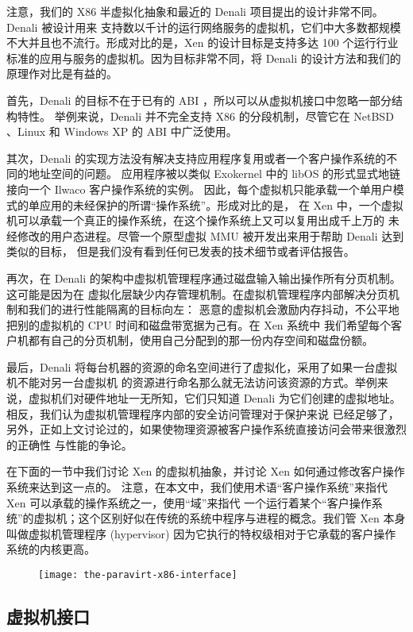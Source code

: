 注意，我们的 X86 半虚拟化抽象和最近的 Denali 项目提出的设计非常不同。Denali 被设计用来
支持数以千计的运行网络服务的虚拟机，它们中大多数都规模不大并且也不流行。形成对比的是，Xen
的设计目标是支持多达 100 个运行行业标准的应用与服务的虚拟机。因为目标非常不同，将 Denali
的设计方法和我们的原理作对比是有益的。

首先，Denali 的目标不在于已有的 ABI ，所以可以从虚拟机接口中忽略一部分结构特性。
举例来说，Denali 并不完全支持 X86 的分段机制，尽管它在 NetBSD 、Linux 和 Windows XP
的 ABI 中广泛使用。

其次，Denali 的实现方法没有解决支持应用程序复用或者一个客户操作系统的不同的地址空间的问题。
应用程序被以类似 Exokernel 中的 libOS 的形式显式地链接向一个 Ilwaco 客户操作系统的实例。
因此，每个虚拟机只能承载一个单用户模式的单应用的未经保护的所谓“操作系统”。形成对比的是，
在 Xen 中，一个虚拟机可以承载一个真正的操作系统，在这个操作系统上又可以复用出成千上万的
未经修改的用户态进程。尽管一个原型虚拟 MMU 被开发出来用于帮助 Denali 达到类似的目标，
但是我们没有看到任何已发表的技术细节或者评估报告。

再次，在 Denali 的架构中虚拟机管理程序通过磁盘输入输出操作所有分页机制。这可能是因为在
虚拟化层缺少内存管理机制。在虚拟机管理程序内部解决分页机制和我们的进行性能隔离的目标向左：
恶意的虚拟机会激励内存抖动，不公平地把别的虚拟机的 CPU 时间和磁盘带宽据为己有。在 Xen 系统中
我们希望每个客户机都有自己的分页机制，使用自己分配到的那一份内存空间和磁盘份额。

最后，Denali 将每台机器的资源的命名空间进行了虚拟化，采用了如果一台虚拟机不能对另一台虚拟机
的资源进行命名那么就无法访问该资源的方式。举例来说，虚拟机们对硬件地址一无所知，它们只知道
Denali 为它们创建的虚拟地址。相反，我们认为虚拟机管理程序内部的安全访问管理对于保护来说
已经足够了，另外，正如上文讨论过的，如果使物理资源被客户操作系统直接访问会带来很激烈的正确性
与性能的争论。

在下面的一节中我们讨论 Xen 的虚拟机抽象，并讨论 Xen 如何通过修改客户操作系统来达到这一点的。
注意，在本文中，我们使用术语“客户操作系统”来指代 Xen 可以承载的操作系统之一，使用“域”来指代
一个运行着某个“客户操作系统”的虚拟机；这个区别好似在传统的系统中程序与进程的概念。我们管 Xen
本身叫做虚拟机管理程序 (hypervisor) 因为它执行的特权级相对于它承载的客户操作系统的内核更高。

\begin{figure}[h]
    \centering
    \texttt{[image: the-paravirt-x86-interface]}
\end{figure}

\subsection{虚拟机接口}

